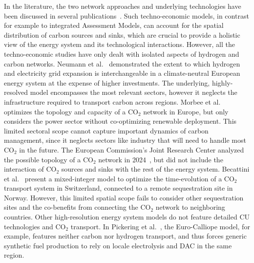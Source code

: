 \documentclass[twocolumn]{article}
\newcommand{\carbon}{CO$_2$}
\begin{document}
In the literature, the two network approaches and underlying technologies have been discussed in several publications~\cite{bakkenLinearModelsOptimization2008,morbeeOptimisedDeploymentEuropean2012,stewartFeasibilityEuropeanwideIntegrated2014,oeiModelingCarbonCapture2014,elahiMultiperiodLeastCost2014,burandtDecarbonizingChinaEnergy2019,middletonSimCCSOpensourceTool2020,bjerketvedtOptimalDesignCost2020,weiProposedGlobalLayout2021,damoreOptimalDesignEuropean2021,becattiniCarbonDioxideCapture2022,neumannBenefitsHydrogenNetwork2022}. Such techno-economic models, in contrast for example to integrated Assessment Models, can account for the spatial distribution of carbon sources and sinks, which are crucial to provide a holistic view of the energy system and its technological interactions. However, all the techno-economic studies have only dealt with isolated aspects of hydrogen and carbon networks. Neumann et al.~\cite{neumannBenefitsHydrogenNetwork2022} demonstrated the extent to which hydrogen and electricity grid expansion is interchangeable in a climate-neutral European energy system at the expense of higher investments. The underlying, highly-resolved model encompasses the most relevant sectors, however it neglects the infrastructure required to transport carbon across regions.
Morbee et al.~\cite{morbeeOptimisedDeploymentEuropean2012} optimizes the topology and capacity of a \carbon{} network in Europe, but only considers the power sector without co-optimizing renewable deployment. This limited sectoral scope cannot capture important dynamics of carbon management, since it neglects sectors like industry that will need to handle most \carbon{} in the future.
The European Commission's Joint Research Center analyzed the possible topology of a \carbon{} network in 2024~\cite{jrc2024}, but did not include the interaction of  \carbon{} sources and sinks with the rest of the energy system.
Becattini et al.~\cite{becattiniCarbonDioxideCapture2022} present a mixed-integer model to optimize the time-evolution of a \carbon{} transport system in Switzerland, connected to a remote sequestration site in Norway. However, this limited spatial scope fails to consider other sequestration sites and the co-benefits from connecting the \carbon{} network to neighboring countries.
Other high-resolution energy system models do not feature detailed CU technologies and \carbon{} transport. In Pickering et al.~\cite{pickeringDiversityOptionsEliminate2022}, the Euro-Calliope model, for example, features neither carbon nor hydrogen transport, and thus forces generic synthetic fuel production to rely on locale electrolysis and DAC in the same region.
\end{document}
